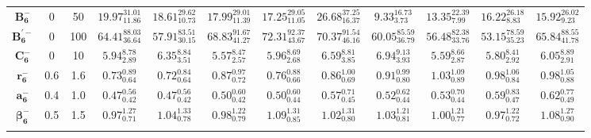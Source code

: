 \begin{tabular}{ c c c c c c c c c c c c}
$\mathbf{B_{6}^{-}}$ & 0 & 50 & $19.97^{31.01}_{11.86}$ & $18.61^{29.62}_{10.73}$ & $17.99^{29.01}_{11.39}$ & $17.25^{29.05}_{11.05}$ & $26.68^{37.25}_{16.37}$ & $9.33^{16.73}_{3.73}$ & $13.35^{22.39}_{7.99}$ & $16.22^{26.18}_{8.83}$ & $15.92^{26.02}_{9.23}$\\ 
$\mathbf{B_{6}^{'-}}$ & 0 & 100 & $64.41^{88.03}_{36.64}$ & $57.91^{83.51}_{30.15}$ & $68.83^{91.67}_{41.27}$ & $72.31^{92.37}_{43.67}$ & $70.37^{91.54}_{46.16}$ & $60.05^{85.59}_{36.79}$ & $56.48^{82.38}_{33.76}$ & $53.15^{78.59}_{35.23}$ & $65.84^{88.55}_{41.78}$\\ 
$\mathbf{C_{6}^{-}}$ & 0 & 10 & $5.94^{8.78}_{2.89}$ & $6.35^{8.84}_{3.51}$ & $5.57^{8.47}_{2.57}$ & $5.96^{8.69}_{2.68}$ & $6.59^{8.81}_{3.85}$ & $6.94^{9.13}_{3.93}$ & $5.59^{8.66}_{2.87}$ & $5.80^{8.41}_{2.92}$ & $6.05^{8.89}_{2.91}$\\ 
$\mathbf{r_{6}^{-}}$ & 0.6 & 1.6 & $0.73^{0.89}_{0.64}$ & $0.72^{0.84}_{0.64}$ & $0.87^{0.97}_{0.72}$ & $0.76^{0.88}_{0.66}$ & $0.86^{1.00}_{0.69}$ & $0.91^{0.99}_{0.80}$ & $1.03^{1.09}_{0.89}$ & $0.98^{1.06}_{0.84}$ & $0.98^{1.05}_{0.88}$\\ 
$\mathbf{a_{6}^{-}}$ & 0.4 & 1.0 & $0.47^{0.56}_{0.42}$ & $0.47^{0.56}_{0.42}$ & $0.50^{0.60}_{0.42}$ & $0.50^{0.60}_{0.44}$ & $0.57^{0.71}_{0.45}$ & $0.52^{0.62}_{0.44}$ & $0.53^{0.70}_{0.44}$ & $0.59^{0.83}_{0.47}$ & $0.62^{0.77}_{0.49}$\\ 
$\mathbf{\beta_{6}^{-}}$ & 0.5 & 1.5 & $0.97^{1.27}_{0.71}$ & $1.04^{1.33}_{0.78}$ & $0.98^{1.22}_{0.79}$ & $1.09^{1.31}_{0.85}$ & $1.02^{1.31}_{0.80}$ & $1.03^{1.21}_{0.81}$ & $1.00^{1.21}_{0.77}$ & $0.97^{1.22}_{0.72}$ & $1.08^{1.27}_{0.90}$\\ 
\\ 
\end{tabular}
\egroup